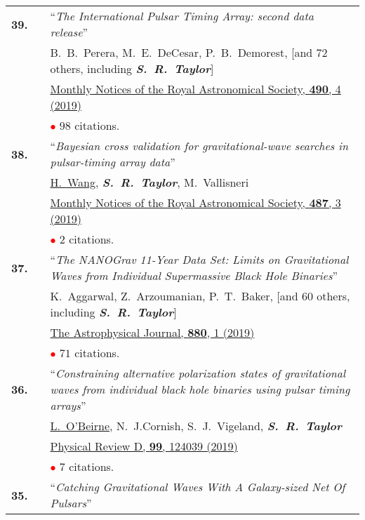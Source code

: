 \documentclass[11pt,letterpaper,sans]{moderncv}
\begin{document}
{\begin{longtable}{rp{0.3cm}p{15.8cm}}
\textbf{39.} & & ``\textit{The International Pulsar Timing Array: second data release}'' \\ 
&&B.~B.~Perera, M.~E.~DeCesar, P.~B.~Demorest, [and 72 others, including \textit{\textbf{S.~R.~Taylor}}] \\
&& \href{https://academic.oup.com/mnras/article-abstract/490/4/4666/5586597?redirectedFrom=fulltext}{{\color{color1} Monthly Notices of the Royal Astronomical Society, \textbf{490}, 4 (2019)}} \\
&& \textcolor{red}{$\bullet$} $98$ citations. \vspace{0.09cm}\\
\textbf{38.} & & ``\textit{Bayesian cross validation for gravitational-wave searches in pulsar-timing array data}'' \\ 
&&\underline{H.~Wang}, \textit{\textbf{S.~R.~Taylor}}, M.~Vallisneri \\
&& \href{https://academic.oup.com/mnras/article/487/3/3644/5511287}{{\color{color1} Monthly Notices of the Royal Astronomical Society, \textbf{487}, 3 (2019)}} \\
&& \textcolor{red}{$\bullet$} $2$ citations. \vspace{0.09cm}\\
\textbf{37.} & & ``\textit{The NANOGrav 11-Year Data Set: Limits on Gravitational Waves from Individual Supermassive Black Hole Binaries}'' \\ 
&&K.~Aggarwal, Z.~Arzoumanian, P.~T.~Baker, [and 60 others, including \textit{\textbf{S.~R.~Taylor}}] \\
&& \href{https://iopscience.iop.org/article/10.3847/1538-4357/ab2236}{{\color{color1} The Astrophysical Journal, \textbf{880}, 1 (2019)}} \\
&& \textcolor{red}{$\bullet$} $71$ citations. \vspace{0.09cm}\\
\textbf{36.} & & ``\textit{Constraining alternative polarization states of gravitational waves from individual black hole binaries using pulsar timing arrays}'' \\ 
&&\underline{L.~O'Beirne}, N.~J.Cornish, S.~J.~Vigeland, \textit{\textbf{S.~R.~Taylor}} \\
&& \href{https://journals.aps.org/prd/abstract/10.1103/PhysRevD.99.124039}{{\color{color1} Physical Review D, \textbf{99}, 124039 (2019)}} \\
&& \textcolor{red}{$\bullet$} $7$ citations. \vspace{0.09cm}\\
\textbf{35.} & & ``\textit{Catching Gravitational Waves With A Galaxy-sized Net Of Pulsars}'' \\ 

\end{longtable}}
\end{document}

